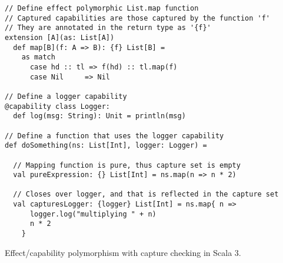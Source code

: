 \begin{algorithm}
\begin{verbatim}
// Define effect polymorphic List.map function
// Captured capabilities are those captured by the function 'f'
// They are annotated in the return type as '{f}'
extension [A](as: List[A])
  def map[B](f: A => B): {f} List[B] =
    as match
      case hd :: tl => f(hd) :: tl.map(f)
      case Nil     => Nil

// Define a logger capability
@capability class Logger:
  def log(msg: String): Unit = println(msg)

// Define a function that uses the logger capability
def doSomething(ns: List[Int], logger: Logger) =

  // Mapping function is pure, thus capture set is empty
  val pureExpression: {} List[Int] = ns.map(n => n * 2)

  // Closes over logger, and that is reflected in the capture set
  val capturesLogger: {logger} List[Int] = ns.map{ n =>
      logger.log("multiplying " + n)
      n * 2
    }
\end{verbatim}

\caption{Effect/capability polymorphism with capture checking in Scala 3. \label{scala:cc-eff-polymorphism}}
\end{algorithm}
